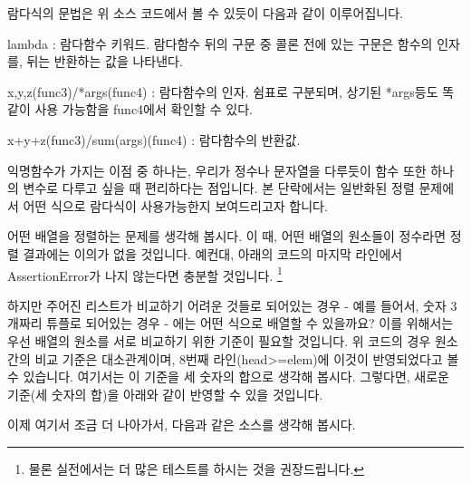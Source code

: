 \documentclass[twoside]{article}
\begin{document}


람다식의 문법은 위 소스 코드에서 볼 수 있듯이 다음과 같이 이루어집니다. 

\begin{compactitem} 
\item lambda : 람다함수 키워드. 람다함수 뒤의 구문 중 콜론 전에 있는 구문은 함수의 인자를, 뒤는 반환하는 값을 나타낸다. 
\item x,y,z(func3)/*args(func4) : 람다함수의 인자. 쉼표로 구분되며, 상기된 *args등도 똑같이 사용 가능함을 func4에서 확인할 수 있다. 
\item x+y+z(func3)/sum(args)(func4) : 람다함수의 반환값. 
\end{compactitem}

익명함수가 가지는 이점 중 하나는, 우리가 정수나 문자열을 다루듯이 함수 또한 하나의 변수로 다루고 싶을 때 편리하다는 점입니다. 본 단락에서는 일반화된 정렬 문제에서 어떤 식으로 람다식이 사용가능한지 보여드리고자 합니다. 

어떤 배열을 정렬하는 문제를 생각해 봅시다. 이 때, 어떤 배열의 원소들이 정수라면 정렬 결과에는 이의가 없을 것입니다. 예컨대, 아래의 코드의 마지막 라인에서 AssertionError가 나지 않는다면 충분할 것입니다. \footnote{물론 실전에서는 더 많은 테스트를 하시는 것을 권장드립니다.}





하지만 주어진 리스트가 비교하기 어려운 것들로 되어있는 경우 - 예를 들어서, 숫자 3개짜리 튜플로 되어있는 경우 - 에는 어떤 식으로 배열할 수 있을까요? 이를 위해서는 우선 배열의 원소를 서로 비교하기 위한 기준이 필요할 것입니다. 위 코드의 경우 원소간의 비교 기준은 대소관계이며, 8번째 라인(head>=elem)에 이것이 반영되었다고 볼 수 있습니다. 여기서는 이 기준을 세 숫자의 합으로 생각해 봅시다. 그렇다면, 새로운 기준(세 숫자의 합)을 아래와 같이 반영할 수 있을 것입니다. 




이제 여기서 조금 더 나아가서, 다음과 같은 소스를 생각해 봅시다. 


\end{document}
